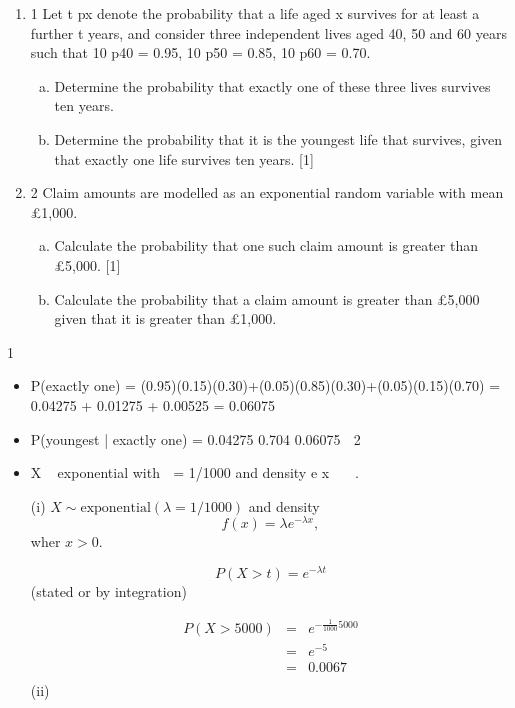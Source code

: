 \documentclass[a4paper,12pt]{article}
\begin{document}
\begin{enumerate}
\begin{enumerate}
\item 1 Let t px denote the probability that a life aged x survives for at least a further t years,
and consider three independent lives aged 40, 50 and 60 years such that
10 p40 = 0.95, 10 p50 = 0.85, 10 p60 = 0.70.
\begin{enumerate}[(a)]
\item Determine the probability that exactly one of these three lives survives ten
years. 
\item Determine the probability that it is the youngest life that survives, given that
exactly one life survives ten years. [1]
\end{enumerate}
\item 2 Claim amounts are modelled as an exponential random variable with mean £1,000.
\begin{enumerate}[(a)]
\item Calculate the probability that one such claim amount is greater than £5,000.
[1]
\item Calculate the probability that a claim amount is greater than £5,000 given that
it is greater than £1,000. 
\end{enumerate}

\end{enumerate}
1 
\begin{itemize} \item P(exactly one) = (0.95)(0.15)(0.30)+(0.05)(0.85)(0.30)+(0.05)(0.15)(0.70)
= 0.04275 + 0.01275 + 0.00525 = 0.06075
\item P(youngest | exactly one) = 0.04275 0.704
0.06075 
2 \item X ~ exponential with  = 1/1000 and density e x 
 .


(i) $X \sim \mbox{exponential}(\lambda = 1/1000)$ and density 
\[ f(x) = \lambda e^{ -\lambda  x} ,\] wher $x > 0 $.

\[P(X > t) = e^{ -\lambda  t} \](stated or by integration)

\begin{eqnarray*} 
P(X > 5000) &=& e^{ - \frac{1}{1000} 5000} \\
&=& e^{-5}\\
&=& 0.0067 \\
\end{eqnarray*}
(ii)


\end{itemize}
\end{enumerate}
\end{document}
